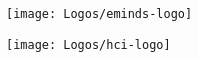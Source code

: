 \begin{figure}[th]
	\begin{center}
		\texttt{[image: Logos/eminds-logo]}
	\end{center}
\end{figure}

\vskip 12.5cm

\begin{figure}[bh]
	\begin{center}
		\texttt{[image: Logos/hci-logo]}
	\end{center}
\end{figure}

